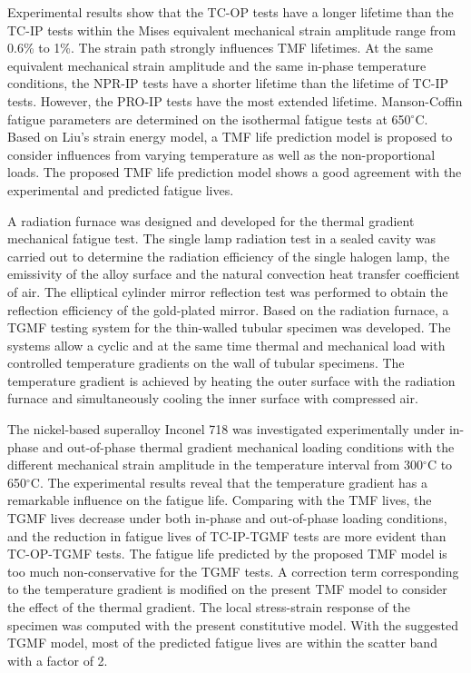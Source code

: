 Experimental results show that the TC-OP tests have a longer lifetime than the TC-IP tests within the Mises equivalent mechanical strain amplitude range from 0.6\% to 1\%.
The strain path strongly influences TMF lifetimes. At the same equivalent mechanical strain amplitude and the same in-phase temperature conditions, the NPR-IP tests have a shorter lifetime than the lifetime of TC-IP tests. However, the PRO-IP tests have the most extended lifetime.
Manson-Coffin fatigue parameters are determined on the isothermal fatigue tests at 650$^\circ$C. Based on Liu's strain energy model, a TMF life prediction model is proposed to consider influences from varying temperature as well as the non-proportional loads. The proposed TMF life prediction model shows a good agreement with the experimental and predicted fatigue lives.

A radiation furnace was designed and developed for the thermal gradient mechanical fatigue test. The single lamp radiation test in a sealed cavity was carried out to determine the radiation efficiency of the single halogen lamp, the emissivity of the alloy surface and the natural convection heat transfer coefficient of air. The elliptical cylinder mirror reflection test was performed to obtain the reflection efficiency of the gold-plated mirror. Based on the radiation furnace, a TGMF testing system for the thin-walled tubular specimen was developed. The systems allow a cyclic and at the same time thermal and mechanical load with controlled temperature gradients on the wall of tubular specimens. The temperature gradient is achieved by heating the outer surface with the radiation furnace and simultaneously cooling the inner surface with compressed air. 

The nickel-based superalloy Inconel 718 was investigated experimentally under in-phase and out-of-phase thermal gradient mechanical loading conditions with the different mechanical strain amplitude in the temperature interval from 300$^\circ$C to 650$^\circ$C. The experimental results reveal that the temperature gradient has a remarkable influence on the fatigue life. Comparing with the TMF lives, the TGMF lives decrease under both in-phase and out-of-phase loading conditions, and the reduction in fatigue lives of TC-IP-TGMF tests are more evident than TC-OP-TGMF tests. The fatigue life predicted by the proposed TMF model is too much non-conservative for the TGMF tests. A correction term corresponding to the temperature gradient is modified on the present TMF model to consider the effect of the thermal gradient. The local stress-strain response of the specimen was computed with the present constitutive model. With the suggested TGMF model, most of the predicted fatigue lives are within the scatter band with a factor of 2.


